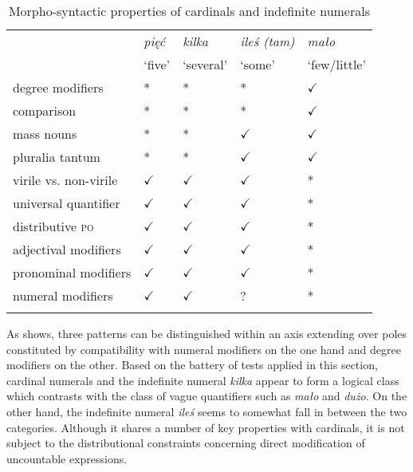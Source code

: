 \documentclass[output=paper,
]{langscibook}
\begin{document}
	\begin{table}[h]
		\centering
		\caption{Morpho-syntactic properties of cardinals and indefinite numerals}
		\label{table:morpho-syntactic-properties-of-cardinals-and-indefinite-numerals}
		\begin{tabularx}{0.9\textwidth}{@{}lXXXX@{}}
			\lsptoprule
			\multirow{2}{*}{}          & \multicolumn{1}{l}{\textit{pięć}} & \multicolumn{1}{l}{\textit{kilka}} & \multicolumn{1}{l}{\textit{ileś (tam)}} & \multicolumn{1}{l}{\textit{mało}}  \\
			& \multicolumn{1}{l}{\small{`five'}}      & \multicolumn{1}{l}{\small{`several'}}    & \multicolumn{1}{l}{\small{`some'}}            & \multicolumn{1}{l}{\small{`few/little'}} \\ 
\midrule
degree modifiers     & * & * & *  & $\checkmark$  \\
comparison   & * & *  & *  & $\checkmark$   \\
mass nouns   & *  & * & $\checkmark$  & $\checkmark$ \\
pluralia tantum & * & * & $\checkmark$ & $\checkmark$ \\
virile vs. non-virile & $\checkmark$ & $\checkmark$ & $\checkmark$ & * \\
universal quantifier & $\checkmark$ & $\checkmark$ & $\checkmark$ & * \\
distributive \textsc{po} & $\checkmark$ & $\checkmark$ & $\checkmark$ & *\\
adjectival modifiers  & $\checkmark$ & $\checkmark$ & $\checkmark$ & * \\
pronominal modifiers & $\checkmark$ & $\checkmark$ & $\checkmark$ & * \\
numeral modifiers & $\checkmark$ & $\checkmark$ & ? & * \\ 
\lspbottomrule
\end{tabularx}
\end{table}
	
	\normalsize
	
	As  shows, three patterns can be distinguished within an axis extending over poles constituted by compatibility with numeral modifiers on the one hand and degree modifiers on the other. Based on the battery of tests applied in this section, cardinal numerals and the indefinite numeral \textit{kilka} appear to form a logical class which contrasts with the class of vague quantifiers such as \textit{mało} and \textit{dużo}. On the other hand, the indefinite numeral \textit{ileś} seems to somewhat fall in between the two categories. Although it shares a number of key properties with cardinals, it is not subject to the distributional constraints concerning direct modification of uncountable expressions. 
	
\end{document}
